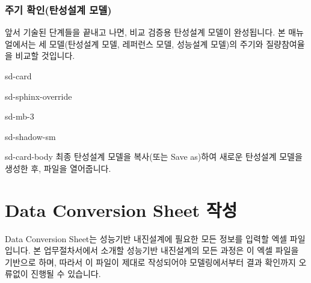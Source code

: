 \documentclass[a4paper,10pt,korean]{sphinxmanual}
\begin{document}
\subsubsection{주기 확인(탄성설계 모델)}
\label{\detokenize{1_period_check_elastic:id1}}\label{\detokenize{1_period_check_elastic::doc}}
\sphinxAtStartPar
앞서 기술된 단계들을 끝내고 나면, 비교 검증용 탄성설계 모델이 완성됩니다.
본 매뉴얼에서는 세 모델(탄성설계 모델, 레퍼런스 모델, 성능설계 모델)의 주기와 질량참여율을 비교할 것입니다.

\begin{sphinxuseclass}{sd-card}
\begin{sphinxuseclass}{sd-sphinx-override}
\begin{sphinxuseclass}{sd-mb-3}
\begin{sphinxuseclass}{sd-shadow-sm}
\begin{sphinxuseclass}{sd-card-body}
\sphinxAtStartPar
최종 탄성설계 모델을 복사(또는 Save as)하여 새로운 탄성설계 모델을 생성한 후, 파일을 열어줍니다.

\end{sphinxuseclass}
\end{sphinxuseclass}
\end{sphinxuseclass}
\end{sphinxuseclass}
\end{sphinxuseclass}
\sphinxstepscope


\section{Data Conversion Sheet 작성}
\label{\detokenize{2_data_conv_sheets:data-conversion-sheet}}\label{\detokenize{2_data_conv_sheets::doc}}
\sphinxAtStartPar
{}

\sphinxAtStartPar
Data Conversion Sheet는 성능기반 내진설계에 필요한 모든 정보를 입력할 엑셀 파일입니다.
본 업무절차서에서 소개할 성능기반 내진설계의 모든 과정은 이 엑셀 파일을 기반으로 하며,
따라서 이 파일이 제대로 작성되어야 모델링에서부터 결과 확인까지 오류없이 진행될 수 있습니다.
\end{document}
